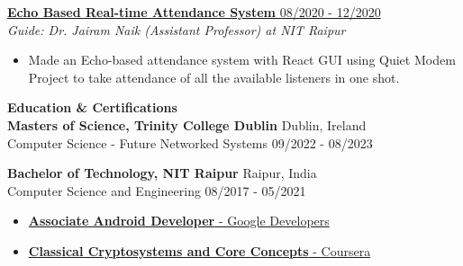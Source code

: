 \documentclass{article}
\begin{document}
\noindent \normalsize \href{https://dx.doi.org/10.1504/ijiids.2022.10044370}{\textbf{Echo Based Real-time Attendance System} \hfill 08/2020 - 12/2020} \\
\textit{Guide: Dr. Jairam Naik (Assistant Professor) at NIT Raipur}
\begin{itemize}
    \item  Made an Echo-based attendance system with React GUI using Quiet Modem Project to take attendance of all the available listeners in one shot.
\end{itemize}
\noindent \large \textbf{\textcolor{NavyBlue}{Education \& Certifications}} \vspace{3pt} \\
\normalsize \textbf{Masters of Science, Trinity College Dublin} \hfill Dublin, Ireland\\
Computer Science - Future Networked Systems \hfill 09/2022 - 08/2023
\vspace{3pt}

\noindent \normalsize \textbf{Bachelor of Technology, NIT Raipur} \hfill Raipur, India \\
Computer Science and Engineering \hfill 08/2017 - 05/2021
\vspace{3pt}

\begin{itemize}[noitemsep,nolistsep,leftmargin=*]
    \item { \normalsize \href{https://www.credential.net/623b189c-719c-4845-b489-1b1618d4da79}{\textbf{Associate Android Developer} - Google Developers } }
    \item { \normalsize \href{https://www.coursera.org/account/accomplishments/certificate/X4CNCJXC335V}{\textbf{Classical Cryptosystems and Core Concepts} - Coursera} }
\end{itemize}
\vspace{3pt}

\end{document}
